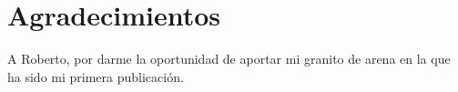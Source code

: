 \chapter{Agradecimientos}
A Roberto, por darme la oportunidad de aportar mi granito de arena en la que ha sido mi primera publicación.

\newpage
\thispagestyle{empty}
\hspace*{0.5cm}
\newpage
